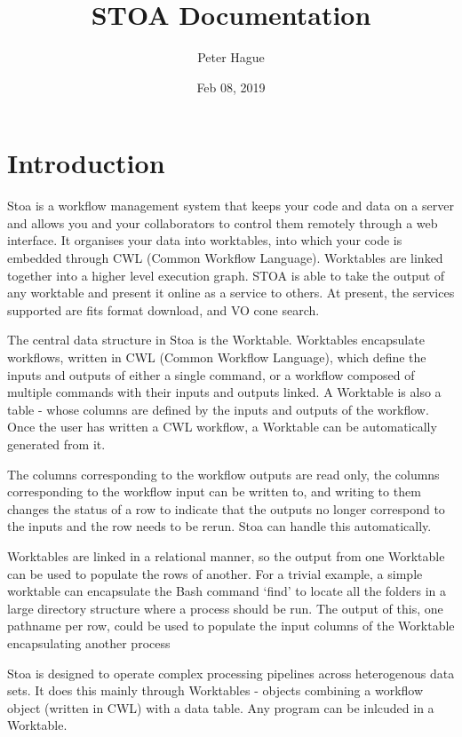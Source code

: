 \documentclass[letterpaper,10pt,english]{sphinxmanual}
\title{STOA Documentation}
\date{Feb 08, 2019}
\author{Peter Hague}
\begin{document}
\pagestyle{empty}
\sphinxmaketitle
\pagestyle{plain}
\sphinxtableofcontents
\pagestyle{normal}
\label{\detokenize{index::doc}}



\chapter{Introduction}
\label{\detokenize{starting:introduction}}\label{\detokenize{starting::doc}}
Stoa is a workflow management system that keeps your code and data on a server and allows you and your collaborators to control them remotely through a web interface. It organises your data into worktables, into which your code is embedded through CWL (Common Workflow Language). Worktables are linked together into a higher level execution graph. STOA is able to take the output of any worktable and present it online as a service to others. At present, the services supported are fits format download, and VO cone search.

The central data structure in Stoa is the Worktable. Worktables encapsulate
workflows, written in CWL (Common Workflow Language), which define the inputs and
outputs of either a single command, or a workflow composed of multiple commands
with their inputs and outputs linked. A Worktable is also a table - whose columns
are defined by the inputs and outputs of the workflow. Once the user has written
a CWL workflow, a Worktable can be automatically generated from it.

The columns corresponding to the workflow outputs are read only, the columns corresponding
to the workflow input can be written to, and writing to them changes the status of a row
to indicate that the outputs no longer correspond to the inputs and the row needs to be
rerun. Stoa can handle this automatically.

Worktables are linked in a relational manner, so the output from one Worktable can be used
to populate the rows of another. For a trivial example, a simple worktable can encapsulate the Bash
command ‘find’ to locate all the folders in a large directory structure where a process
should be run. The output of this, one pathname per row, could be used to populate the input
columns of the Worktable encapsulating another process

Stoa is designed to operate complex processing pipelines across heterogenous
data sets. It does this mainly through Worktables - objects combining a workflow
object (written in CWL) with a data table. Any program can be inlcuded in a
Worktable.
\end{document}
